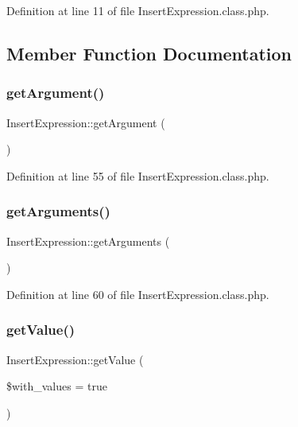 Definition at line 11 of file Insert\+Expression.\+class.\+php.



\subsection{Member Function Documentation}
\mbox{\label{classInsertExpression_aa0f93cc5194b4605d63f96b53f3d037d}} 
\subsubsection{\texorpdfstring{get\+Argument()}{getArgument()}}
{\footnotesize\ttfamily Insert\+Expression\+::get\+Argument (\begin{DoxyParamCaption}{ }\end{DoxyParamCaption})}



Definition at line 55 of file Insert\+Expression.\+class.\+php.

\mbox{\label{classInsertExpression_aa18be08ea777a25c8f06505d8710ced2}} 
\subsubsection{\texorpdfstring{get\+Arguments()}{getArguments()}}
{\footnotesize\ttfamily Insert\+Expression\+::get\+Arguments (\begin{DoxyParamCaption}{ }\end{DoxyParamCaption})}



Definition at line 60 of file Insert\+Expression.\+class.\+php.

\mbox{\label{classInsertExpression_ad9d21fa7983a8d93730c6d16b24a0c32}} 
\subsubsection{\texorpdfstring{get\+Value()}{getValue()}}
{\footnotesize\ttfamily Insert\+Expression\+::get\+Value (\begin{DoxyParamCaption}\item[{}]{\$with\+\_\+values = {\ttfamily true} }\end{DoxyParamCaption})}



